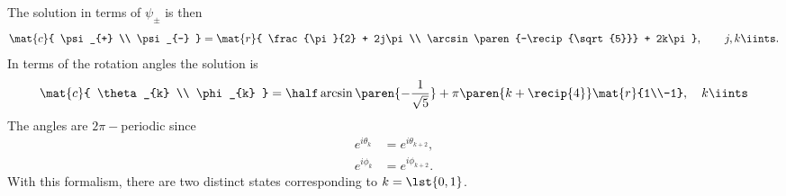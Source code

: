 %
The solution in terms of $\psi_{\pm}$ is then
%
\begin{equation}
  \mat{c}{ \psi_{+} \\ \psi_{-} } = 
  \mat{r}{ \frac{\pi}{2} + 2j\pi \\ \arcsin\paren{-\recip{\sqrt{5}}} + 2k\pi }, \qquad j,k \iints.
\end{equation}
%
In terms of the rotation angles the solution is
%
\begin{equation}
  \mat{c}{ \theta_{k} \\ \phi_{k} } = \half \arcsin\paren{-\frac{1} {\sqrt{5}}} + \pi \paren{k+\recip{4}} \mat{r}{1\\-1} , \quad k \iints
\label{eq:examples:jcf2}
\end{equation}
%
The angles are $2\pi-$periodic since
\begin{equation}
  \begin{split}
    e^{i\theta_{k}} &= e^{i\theta_{k+2}}, \\
    e^{i\phi_{k}} &= e^{i\phi_{k+2}}.
  \end{split}
\end{equation}
%
With this formalism, there are two distinct states corresponding to $k=\lst{0,1}$.


\endinput